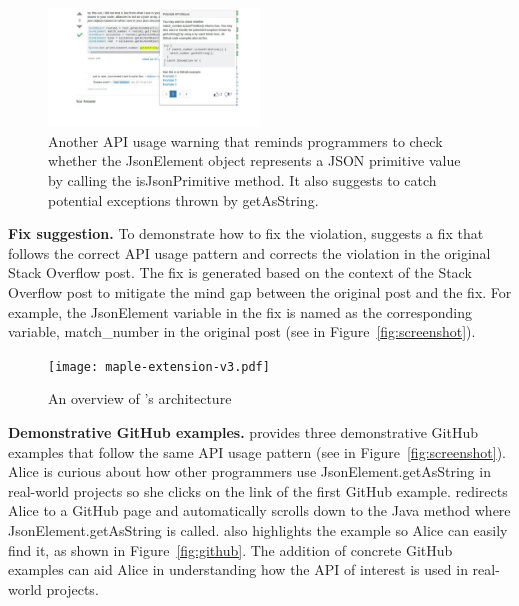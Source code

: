 \begin{figure}
\centering
\includegraphics[width=0.5\textwidth]{soap-v3-2.pdf}
  \vspace{.1in}
  \caption{Another API usage warning that reminds programmers to check whether the {\ttt JsonElement} object represents a {\ttt JSON} primitive value by calling the {\ttt isJsonPrimitive} method. It also suggests to catch potential exceptions thrown by {\ttt getAsString}.}
  \label{fig:screenshot2}
\end{figure}

{\bf Fix suggestion.} To demonstrate how to fix the violation, {\tool} suggests a fix that follows the correct API usage pattern and corrects the violation in the original Stack Overflow post. The fix is generated based on the context of the Stack Overflow post to mitigate the mind gap between the original post and the fix. For example, the {\ttt JsonElement} variable in the fix is named as the corresponding variable, {\ttt match\_number} in the original post (see  in Figure~\ref{fig:screenshot}). 

\begin{figure}[!th]
\centering
\texttt{[image: maple-extension-v3.pdf]}
\vspace{.1in}
\caption{An overview of {\tool}'s architecture}
\label{fig:arch}
\end{figure}

{\bf Demonstrative GitHub examples.} {\tool} provides three demonstrative GitHub examples that follow the same API usage pattern (see  in Figure~\ref{fig:screenshot}). Alice is curious about how other programmers use {\ttt JsonElement.getAsString} in real-world projects so she clicks on the link of the first GitHub example. {\tool} redirects Alice to a GitHub page and automatically scrolls down to the Java method where {\ttt JsonElement.getAsString} is called. {\tool} also highlights the example so Alice can easily find it, as shown in Figure~\ref{fig:github}. The addition of concrete GitHub examples can aid Alice in understanding how the API of interest is used in real-world projects. 


